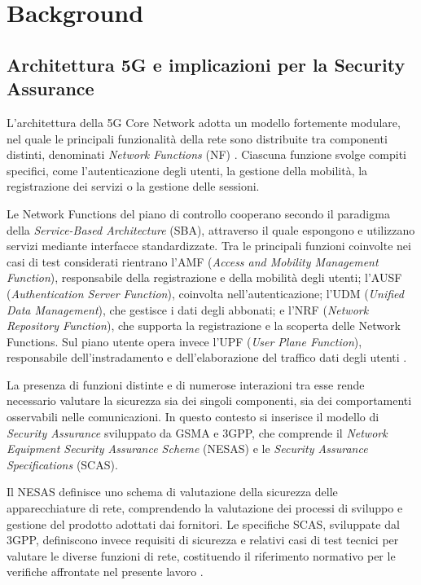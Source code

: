 \chapter{Background}\label{background}

\section{Architettura 5G e implicazioni per la Security Assurance}\label{architettura-5g-e-implicazioni-per-la-security-assurance}

L'architettura della 5G Core Network adotta un modello fortemente modulare, nel quale le principali funzionalità della rete sono distribuite tra componenti distinti, denominati \emph{Network Functions} (NF) \cite{3gpp_ts23501_2023}. Ciascuna funzione svolge compiti specifici, come l'autenticazione degli utenti, la gestione della mobilità, la registrazione dei servizi o la gestione delle sessioni.

Le Network Functions del piano di controllo cooperano secondo il paradigma della \emph{Service-Based Architecture} (SBA), attraverso il quale espongono e utilizzano servizi mediante interfacce standardizzate. Tra le principali funzioni coinvolte nei casi di test considerati rientrano l'AMF (\emph{Access and Mobility Management Function}), responsabile della registrazione e della mobilità degli utenti; l'AUSF (\emph{Authentication Server Function}), coinvolta nell'autenticazione; l'UDM (\emph{Unified Data Management}), che gestisce i dati degli abbonati; e l'NRF (\emph{Network Repository Function}), che supporta la registrazione e la scoperta delle Network Functions. Sul piano utente opera invece l'UPF (\emph{User Plane Function}), responsabile dell'instradamento e dell'elaborazione del traffico dati degli utenti \cite{3gpp_ts23501_2023,3gpp_ts33501_2021}.

La presenza di funzioni distinte e di numerose interazioni tra esse rende necessario valutare la sicurezza sia dei singoli componenti, sia dei comportamenti osservabili nelle comunicazioni. In questo contesto si inserisce il modello di \emph{Security Assurance} sviluppato da GSMA e 3GPP, che comprende il \emph{Network Equipment Security Assurance Scheme} (NESAS) e le \emph{Security Assurance Specifications} (SCAS).

Il NESAS definisce uno schema di valutazione della sicurezza delle apparecchiature di rete, comprendendo la valutazione dei processi di sviluppo e gestione del prodotto adottati dai fornitori. Le specifiche SCAS, sviluppate dal 3GPP, definiscono invece requisiti di sicurezza e relativi casi di test tecnici per valutare le diverse funzioni di rete, costituendo il riferimento normativo per le verifiche affrontate nel presente lavoro \cite{gsma_fs13_2025,gsma_fs63_2025}.

